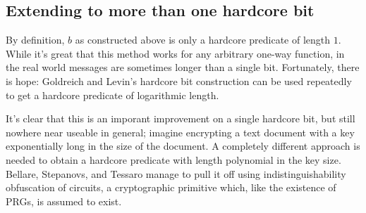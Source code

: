 \subsection{Extending to more than one hardcore
bit}\label{Extending-to-more-than-one-har}

By definition, \(b\) as constructed above is only a hardcore predicate
of length \(1\). While it's great that this method works for any
arbitrary one-way function, in the real world messages are sometimes
longer than a single bit. Fortunately, there is hope: Goldreich and
Levin's hardcore bit construction can be used repeatedly to get a
hardcore predicate of logarithmic length.

\hypertarget{LogHCBthm}{}

It's clear that this is an imporant improvement on a single hardcore
bit, but still nowhere near useable in general; imagine encrypting a
text document with a key exponentially long in the size of the document.
A completely different approach is needed to obtain a hardcore predicate
with length polynomial in the key size. Bellare, Stepanovs, and Tessaro
manage to pull it off using indistinguishability obfuscation of
circuits, a cryptographic primitive which, like the existence of PRGs,
is assumed to exist.

\hypertarget{PolyHCBthm}{}

